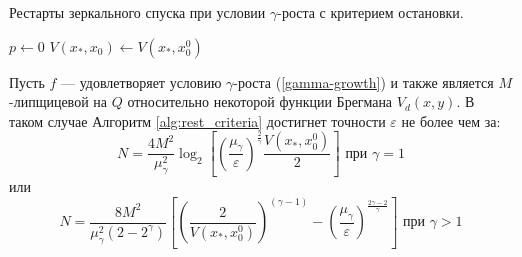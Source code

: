 \begin{algorithm}[htp]
    \caption{Рестарты зеркального спуска при условии $\gamma$-роста с критерием остановки.}
    \label{alg:rest_criteria}
    $p \gets 0$\;
    $V(x_*, x_0) \gets V(x_*,x_0^0)$\;
\end{algorithm}
\begin{theorem}
    Пусть $f$ --- удовлетворяет условию $\gamma$-роста (\ref{gamma-growth}) и также является $M$-липщицевой на $Q$ относительно некоторой функции Брегмана $V_d(x, y)$. В таком случае Алгоритм \ref{alg:rest_criteria} достигнет точности $\varepsilon$ не более чем за:
    \begin{equation}
       N =  \frac{4 M^2}{\mu_{\gamma}^2} \log_2{\left[\left(\frac{\mu_{\gamma}}{\varepsilon}\right)^{\frac{2}{\gamma}} \frac{V(x_*, x_0^0)}{2}\right]} \text{ при } \gamma = 1
   \end{equation}
   или
   \begin{equation}
       N = \frac{8  M^2}{\mu_{\gamma}^2 (2 - 2^{\gamma})} \left[ \left(\frac{2}{V(x_*, x_0^0)}\right)^{(\gamma - 1)}  - \left(\frac{\mu_{\gamma}}{\varepsilon}\right)^{\frac{2\gamma - 2}{\gamma}} \right] \text{ при } \gamma > 1
   \end{equation}
\end{theorem}
\textbf{}
